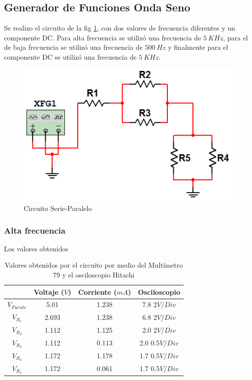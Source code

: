 \documentclass[twocolumn]{IEEEtran}
\begin{document}
\subsection{Generador de Funciones Onda Seno}
\noindent
Se realizo el circuito de la fig \ref{fig2}, con dos valores de frecuencia
diferentes y un componente DC. Para alta frecuencia se utilizó una frecuencia de
$5 \ KHz$, para el de baja frecuencia se utilizó una frecuencia de $500 \ Hz$ y
finalmente para el componente DC se utilizó una frecuencia de $5 \ KHz$.
\begin{figure}[H]
	\centering
		\includegraphics[scale=0.5]{circuit_2.png}
	\caption{Circuito Serie-Paralelo}
	\label{fig2}
\end{figure}

\subsubsection{Alta frecuencia}
Los valores obtenidos
\begin{table}[H]
	\centering
\begin{tabular}[c]{|c|c|c|c|} \hline
 & Voltaje ($V$) & Corriente ($mA$) & Osciloscopio \\ \hline
$V_{Fuente}$ & 5.01 & 1.238 & 7.8 2$V/Div$ \\ \hline
$V_{R_{1}}$ & 2.693 & 1.238 & 6.8 2$V/Div$ \\ \hline
$V_{R_{2}}$ & 1.112 & 1.125 & 2.0 2$V/Div$ \\ \hline
$V_{R_{3}}$ & 1.112 & 0.113 & 2.0 0.5$V/Div$ \\ \hline
$V_{R_{4}}$ & 1.172 & 1.178 & 1.7 0.5$V/Div$ \\ \hline
$V_{R_{5}}$ & 1.172 & 0.061 & 1.7 0.5$V/Div$ \\ \hline
\end{tabular}
	\caption{Valores obtenidos por el circuito por medio del Multímetro 79 y
el osciloscopio Hitachi}
	\label{tab5}
\end{table}
\end{document}
